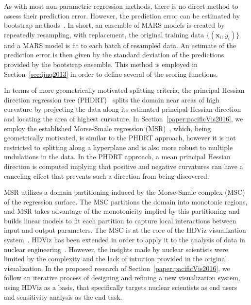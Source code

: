 As with most non-parametric regression methods, there is no direct method to assess their prediction error.
%
However, the prediction error can be estimated by bootstrap methods~\cite{DavisonHinkley1997}.
%
In short, an ensemble of MARS models is created by repeatedly resampling, with replacement, the original training data $\{ (\mathbf{x}_i, y_i) \}$ and a MARS model is fit to each batch of resampled data.
%
An estimate of the prediction error is then given by the standard deviation of the predictions provided by the bootstrap ensemble.
%
This method is employed in Section~\ref{sec:ijuq2013} in order to define several of the scoring functions.

In terms of more geometrically motivated splitting criteria, the principal Hessian direction regression tree (PHDRT)~\cite{LiLueChen2000} splits the domain near areas of high curvature by projecting the data along its estimated principal Hessian direction and locating the area of highest curvature.
%
In Section~\ref{paper:pacificVis2016}, we employ the established Morse-Smale regression (MSR)~\cite{GerberRubelBremer2011}, which, being geometrically motivated, is similar to the PHDRT approach, however it is not restricted to splitting along a hyperplane and is also more robust to multiple undulations in the data.
%
In the PHDRT approach, a mean principal Hessian direction is computed implying that positive and negative curvatures can have a canceling effect that prevents such a direction from being discovered.

MSR utilizes a domain partitioning induced by the Morse-Smale complex (MSC) of the regression surface.
%
The MSC partitions the domain into monotonic regions, and MSR takes advantage of the monotonicity implied by this partitioning and builds linear models to fit each partition to capture local interactions between input and output parameters.
%
The MSC is at the core of the HDViz visualization system~\cite{GerberBremerPascucci2010}.
%
HDViz has been extended in order to apply it to the analysis of data in nuclear engineering~\cite{MaljovecLiuWang2015,MaljovecWangMandelli2013a,MaljovecWangPascucci2013}.
%
However, the insights made by nuclear scientists were limited by the complexity and the lack of intuition provided in the original visualization.
%
In the proposed research of Section~\ref{paper:pacificVis2016}, we follow an iterative process of designing and refining a new visualization system, using HDViz as a basis, that specifically targets nuclear scientists as end users and sensitivity analysis as the end task.
%

